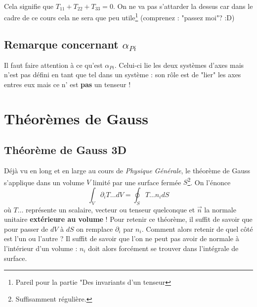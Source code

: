\ \\
        
Cela signifie que $T_{11} + T_{22} + T_{33} = 0$. On ne va pas s'attarder la dessus car dans
le cadre de ce cours cela ne sera que peu utile\footnote{Pareil pour la partie "Des invariants
d'un tenseur} (comprenez : "passez moi"? :D)
    
\subsection{Remarque concernant $\alpha_{Pi}$}
Il faut faire attention à ce qu'est $\alpha_{Pi}$. Celui-ci lie les deux systèmes d'axes mais n'est
pas défini en tant que tel dans un système : son rôle est de "lier" les axes entres eux mais ce n'
est \textbf{pas} un tenseur ! 


\section{Théorèmes de Gauss}
\subsection{Théorème de Gauss 3D}
Déjà vu en long et en large au cours de \textit{Physique Générale}, le théorème de Gauss s'applique
dans un volume $V$ limité par une surface fermée $S$\footnote{Suffisamment régulière.}. On l'énonce
\begin{equation}
	\int_V \partial_i T\dots dV = \oint_S T\dots n_i dS
\end{equation}
où $T\dots$ représente un scalaire, vecteur ou tenseur quelconque et $\vec{n}$ la normale unitaire 
\textbf{extérieure au volume} ! Pour retenir ce théorème, il suffit de savoir que pour passer de
$dV$ à $dS$ on remplace $\partial_i$ par $n_i$. Comment alors retenir de quel côté est l'un ou
l'autre ? Il suffit de savoir que l'on ne peut pas avoir de normale à l'intérieur d'un volume :
$n_i$ doit alors forcément se trouver dans l'intégrale de surface.
    
